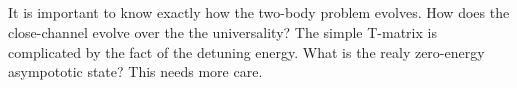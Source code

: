 \subsection{}
It is important to know exactly how the two-body problem evolves.  How does the close-channel evolve over the the universality? The simple T-matrix is complicated by the fact of the detuning energy.  What is the realy zero-energy asympototic state?  This needs more care.  
